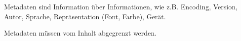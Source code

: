 Metadaten sind Information über Informationen, wie z.B. Encoding, Version, Autor, Sprache, Repräsentation (Font, Farbe), Gerät.

Metadaten müssen vom Inhalt abgegrenzt werden.